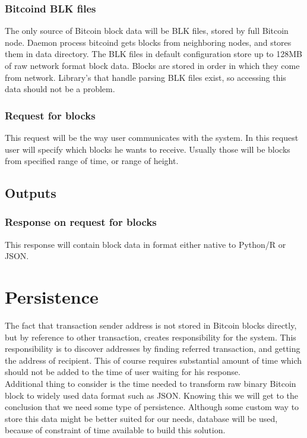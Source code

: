 \documentclass[12pt, en, eng, oneside]{mgr}
\begin{document}
\subsubsection{Bitcoind BLK files}
The only source of Bitcoin block data will be BLK files, stored by full Bitcoin node. Daemon process bitcoind gets blocks from neighboring nodes, and stores them in data directory. The BLK files in default configuration store up to 128MB of raw network format block data. Blocks are stored in order in which they come from network. Library's that handle parsing BLK files exist, so accessing this data should not be a problem.

\subsubsection{Request for blocks} This request will be the way user communicates with the system. In this request user will specify which blocks he wants to receive. Usually those will be blocks from specified range of time, or range of height.

\subsection{Outputs}
\subsubsection{Response on request for blocks} This response will contain block data in format either native to Python/R or JSON.


\section{Persistence}
The fact that transaction sender address is not stored in Bitcoin blocks directly, but by reference to other transaction, creates responsibility for the system. This responsibility is to discover addresses by finding referred transaction, and getting the address of recipient. This of course requires substantial amount of time which should not be added to the time of user waiting for his response. 
\\
Additional thing to consider is the time needed to transform raw binary Bitcoin block to widely used data format such as JSON. Knowing this we will get to the conclusion that we need some type of persistence. Although some custom way to store this data might be better suited for our needs, database will be used, because of constraint of time available to build this solution.
\end{document}

